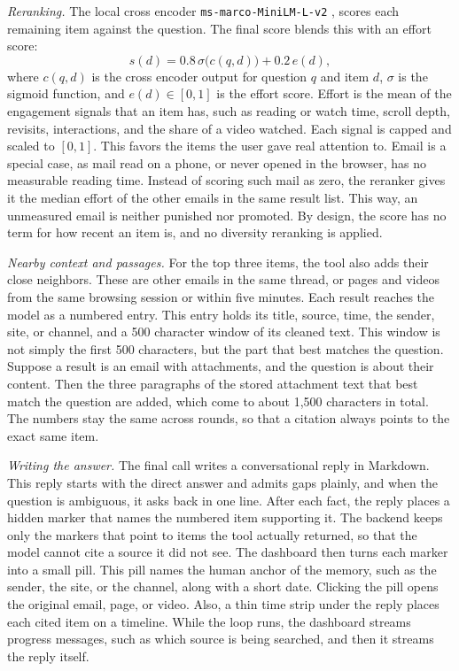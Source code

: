 \documentclass[conference]{IEEEtran}
\newcommand{\rerankmodel}{\texttt{ms\allowbreak-marco\allowbreak-MiniLM\allowbreak-L\allowbreak-6\allowbreak-v2}}
\begin{document}
\textit{Reranking.} The local cross encoder \rerankmodel{} \cite{b10}, \cite{b11} scores each remaining item against the question. The final score blends this with an effort score:
\begin{equation}
s(d) = 0.8\,\sigma\big(c(q,d)\big) + 0.2\,e(d), \label{eq:final}
\end{equation}
where $c(q,d)$ is the cross encoder output for question $q$ and item $d$, $\sigma$ is the sigmoid function, and $e(d) \in [0,1]$ is the effort score. Effort is the mean of the engagement signals that an item has, such as reading or watch time, scroll depth, revisits, interactions, and the share of a video watched. Each signal is capped and scaled to $[0,1]$. This favors the items the user gave real attention to. Email is a special case, as mail read on a phone, or never opened in the browser, has no measurable reading time. Instead of scoring such mail as zero, the reranker gives it the median effort of the other emails in the same result list. This way, an unmeasured email is neither punished nor promoted. By design, the score has no term for how recent an item is, and no diversity reranking is applied.

\textit{Nearby context and passages.} For the top three items, the tool also adds their close neighbors. These are other emails in the same thread, or pages and videos from the same browsing session or within five minutes. Each result reaches the model as a numbered entry. This entry holds its title, source, time, the sender, site, or channel, and a 500 character window of its cleaned text. This window is not simply the first 500 characters, but the part that best matches the question. Suppose a result is an email with attachments, and the question is about their content. Then the three paragraphs of the stored attachment text that best match the question are added, which come to about 1,500 characters in total. The numbers stay the same across rounds, so that a citation always points to the exact same item.

\textit{Writing the answer.} The final call writes a conversational reply in Markdown. This reply starts with the direct answer and admits gaps plainly, and when the question is ambiguous, it asks back in one line. After each fact, the reply places a hidden marker that names the numbered item supporting it. The backend keeps only the markers that point to items the tool actually returned, so that the model cannot cite a source it did not see. The dashboard then turns each marker into a small pill. This pill names the human anchor of the memory, such as the sender, the site, or the channel, along with a short date. Clicking the pill opens the original email, page, or video. Also, a thin time strip under the reply places each cited item on a timeline. While the loop runs, the dashboard streams progress messages, such as which source is being searched, and then it streams the reply itself.
\end{document}
